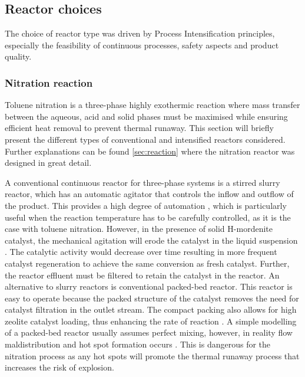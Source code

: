 
\subsection{Reactor choices}
\label{sec:reactorchoices}

The choice of reactor type was driven by Process Intensification principles, especially the feasibility of continuous processes, safety aspects and product quality. 

\subsubsection{Nitration reaction} \label{sec:synthesis-R1}

Toluene nitration is a three-phase highly exothermic reaction where mass transfer between the aqueous, acid and solid phases must be maximised while ensuring efficient heat removal to prevent thermal runaway. This section will briefly present the different types of conventional and intensified reactors considered. Further explanations can be found \cref{sec:reaction} where the nitration reactor was designed in great detail.

A conventional continuous reactor for three-phase systems is a stirred slurry reactor, which has an automatic agitator that controls the inflow and outflow of the product. This provides a high degree of automation \cite{liu_nitration_2019}, which is particularly useful when the reaction temperature has to be carefully controlled, as it is the case with toluene nitration. However, in the presence of solid H-mordenite catalyst, the mechanical agitation will erode the catalyst in the liquid suspension \cite{argyle_heterogeneous_2015}. The catalytic activity would decrease over time resulting in more frequent catalyst regeneration to achieve the same conversion as fresh catalyst. Further, the reactor effluent must be filtered to retain the catalyst in the reactor. 
An alternative to slurry reactors is conventional packed-bed reactor. This reactor is easy to operate because the packed structure of the catalyst removes the need for catalyst filtration in the outlet stream. The compact packing also allows for high zeolite catalyst loading, thus enhancing the rate of reaction \cite{kashid_microstructured_2009}. A simple modelling of a packed-bed reactor usually assumes perfect mixing, however, in reality flow maldistribution and hot spot formation occurs \cite{nguyen_flow_1994}. This is dangerous for the nitration process as any hot spots will promote the thermal runaway process that increases the risk of explosion. 

